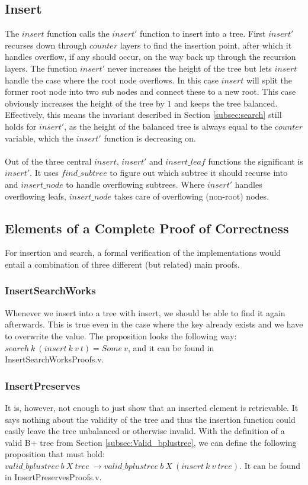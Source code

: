 \subsection{Insert}
The $insert$ function calls the $insert'$ function to insert into a tree. First $insert'$ recurses down through $counter$ layers to find the insertion point, after which it handles overflow, if any should occur, on the way back up through the recursion layers. The function $insert'$ never increases the height of the tree but lets $insert$ handle the case where the root node overflows. In this case $insert$ will split the former root node into two sub nodes and connect these to a new root. This case obviously increases the height of the tree by $1$ and keeps the tree balanced. Effectively, this means the invariant described in Section \ref{subsec:search} still holds for $insert'$, as the height of the balanced tree is always equal to the $counter$ variable, which the $insert'$ function is decreasing on.
\paragraph{}
Out of the three central $insert$, $insert'$ and $insert\_leaf$ functions the significant is $insert'$. It uses $find\_subtree$ to figure out which subtree it should recurse into and $insert\_node$ to handle overflowing subtrees. Where $insert'$ handles overflowing leafs, $insert\_node$ takes care of overflowing (non-root) nodes.

\subsection{Elements of a Complete Proof of Correctness}
For insertion and search, a formal verification of the implementations would entail a combination of three different (but related) main proofs.
\subsubsection{InsertSearchWorks}
Whenever we insert into a tree with insert, we should be able to find it again afterwards. This is true even in the case where the key already exists and we have to overwrite the value. The proposition looks the following way: $search\ k\ (insert\ k\ v\ t) = Some\ v$, and it can be found in InsertSearchWorksProofs.v.
\subsubsection{InsertPreserves}
It is, however, not enough to just show that an inserted element is retrievable. It says nothing about the validity of the tree and thus the insertion function could easily leave the tree unbalanced or otherwise invalid. With the definition of a valid B+ tree from Section \ref{subsec:Valid_bplustree}, we can define the following proposition that must hold: $valid\_bplustree\ b\ X\ tree\ \rightarrow valid\_bplustree\ b\ X\ (insert\ k\ v\ tree)$. It can be found in InsertPreservesProofs.v.
